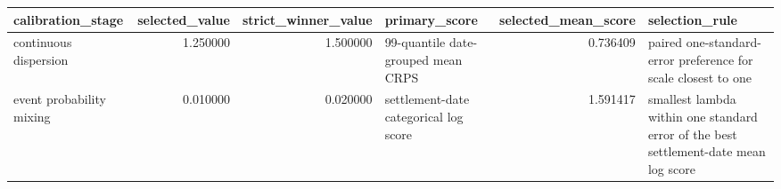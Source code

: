 \begin{tabular}{lrrlrl}
\toprule
calibration\_stage & selected\_value & strict\_winner\_value & primary\_score & selected\_mean\_score & selection\_rule \\
\midrule
continuous dispersion & 1.250000 & 1.500000 & 99-quantile date-grouped mean CRPS & 0.736409 & paired one-standard-error preference for scale closest to one \\
event probability mixing & 0.010000 & 0.020000 & settlement-date categorical log score & 1.591417 & smallest lambda within one standard error of the best settlement-date mean log score \\
\bottomrule
\end{tabular}
